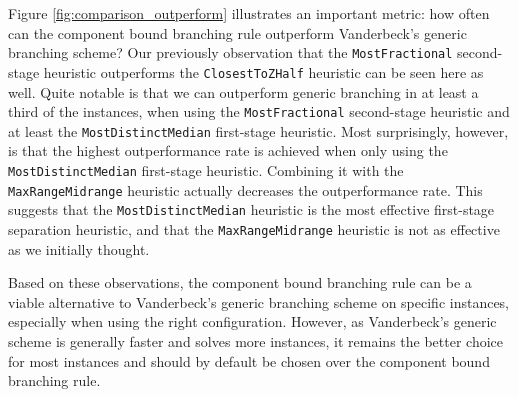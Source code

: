 Figure \ref{fig:comparison_outperform} illustrates an important metric: how often can the component bound branching rule outperform Vanderbeck's generic branching scheme? Our previously observation that the \texttt{MostFractional} second-stage heuristic outperforms the \texttt{ClosestToZHalf} heuristic can be seen here as well. Quite notable is that we can outperform generic branching in at least a third of the instances, when using the \texttt{MostFractional} second-stage heuristic and at least the \texttt{MostDistinctMedian} first-stage heuristic. Most surprisingly, however, is that the highest outperformance rate is achieved when only using the \texttt{MostDistinctMedian} first-stage heuristic. Combining it with the \texttt{MaxRangeMidrange} heuristic actually decreases the outperformance rate. This suggests that the \texttt{MostDistinctMedian} heuristic is the most effective first-stage separation heuristic, and that the \texttt{MaxRangeMidrange} heuristic is not as effective as we initially thought.

Based on these observations, the component bound branching rule can be a viable alternative to Vanderbeck's generic branching scheme on specific instances, especially when using the right configuration. However, as Vanderbeck's generic scheme is generally faster and solves more instances, it remains the better choice for most instances and should by default be chosen over the component bound branching rule.
